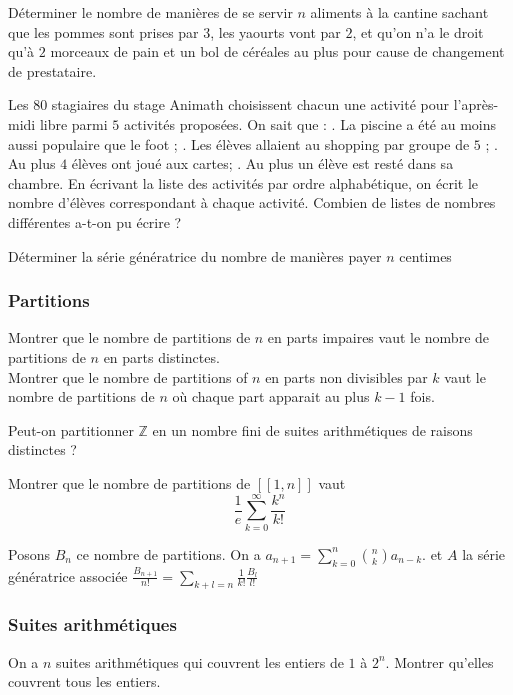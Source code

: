 
\begin{exo}
Déterminer le nombre de manières de se servir $n$ aliments à la cantine sachant que les pommes sont prises par $3$, les yaourts vont par $2$, et qu'on n'a le droit qu'à $2$ morceaux de pain et un bol de céréales au plus pour cause de changement de prestataire.
\end{exo}

\begin{exo}
Les $80$ stagiaires du stage Animath choisissent chacun une activité pour l’après-midi libre parmi $5$ activités proposées. On sait que :
. La piscine a été au moins aussi populaire que le foot ;
. Les élèves allaient au shopping par groupe de $5$ ;
. Au plus $4$ élèves ont joué aux cartes;
. Au plus un élève est resté dans sa chambre.
En écrivant la liste des activités par ordre alphabétique, on écrit le nombre d’élèves correspondant à chaque activité. Combien de listes de nombres différentes a-t-on pu écrire ?
\end{exo}

\begin{exo}
Déterminer la série génératrice du nombre de manières payer $n$ centimes
\end{exo}

\subsubsection{Partitions}

\begin{exo}
Montrer que le nombre de partitions de $n$ en parts impaires vaut le nombre de partitions de $n$ en parts distinctes. \\
Montrer que le nombre de partitions of $n$ en parts non divisibles par $k$ vaut le nombre de partitions de $n$ où chaque part apparait au plus $k - 1$ fois.
\end{exo}

\begin{exo}
Peut-on partitionner $\mathbb Z$ en un nombre fini de suites arithmétiques de raisons distinctes ?
\end{exo}

\begin{exo}
Montrer que le nombre de partitions de $[\![1, n]\!]$ vaut
$$\frac 1e \sum_{k=0}^\infty \frac{k^n}{k!} $$
\end{exo}
\begin{sol}
Posons $B_n$ ce nombre de partitions. On a $a_{n+1} = \sum_{k=0}^n {n \choose k} a_{n - k}$. et $A$ la série génératrice associée
$\frac{B_{n+1}}{n!} = \sum_{k+l=n} \frac 1{k!}\frac{B_l}{l!}$
\end{sol}

\subsubsection{Suites arithmétiques}

\begin{exo}
On a $n$ suites arithmétiques qui couvrent les entiers de $1$ à $2^n$. Montrer qu'elles couvrent tous les entiers.
\end{exo}